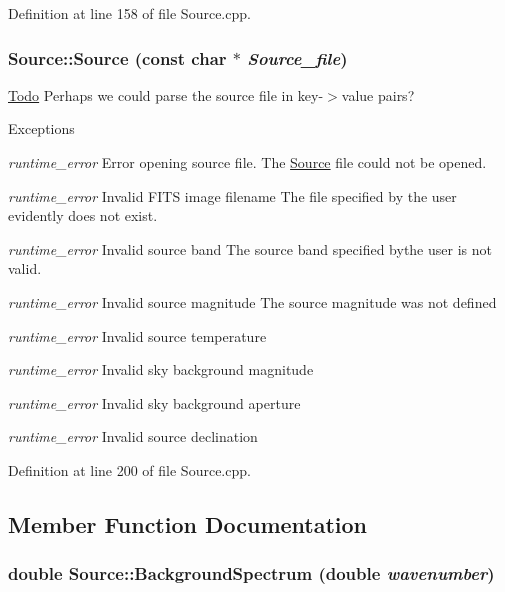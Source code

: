 Definition at line 158 of file Source.cpp.

\hypertarget{classSource_a7a7af8ba36f94e74bf2d780f6636cfe4}{
\subsubsection[{Source}]{\setlength{\rightskip}{0pt plus 5cm}Source::Source (const char $\ast$ {\em Source\_\-file})}}
\label{classSource_a7a7af8ba36f94e74bf2d780f6636cfe4}


\begin{Desc}
\item[\hyperlink{todo__todo000002}{Todo}]Perhaps we could parse the source file in key-\/$>$value pairs? \end{Desc}



\begin{DoxyExceptions}{Exceptions}
\item[{\em runtime\_\-error}]Error opening source file. The \hyperlink{classSource}{Source} file could not be opened.\item[{\em runtime\_\-error}]Invalid FITS image filename The file specified by the user evidently does not exist.\item[{\em runtime\_\-error}]Invalid source band The source band specified bythe user is not valid.\item[{\em runtime\_\-error}]Invalid source magnitude The source magnitude was not defined\item[{\em runtime\_\-error}]Invalid source temperature\item[{\em runtime\_\-error}]Invalid sky background magnitude\item[{\em runtime\_\-error}]Invalid sky background aperture\item[{\em runtime\_\-error}]Invalid source declination\end{DoxyExceptions}




Definition at line 200 of file Source.cpp.



\subsection{Member Function Documentation}
\hypertarget{classSource_a29c1541293674ddb2b9e7aa4cb130306}{
\subsubsection[{BackgroundSpectrum}]{\setlength{\rightskip}{0pt plus 5cm}double Source::BackgroundSpectrum (double {\em wavenumber})}}
\label{classSource_a29c1541293674ddb2b9e7aa4cb130306}


